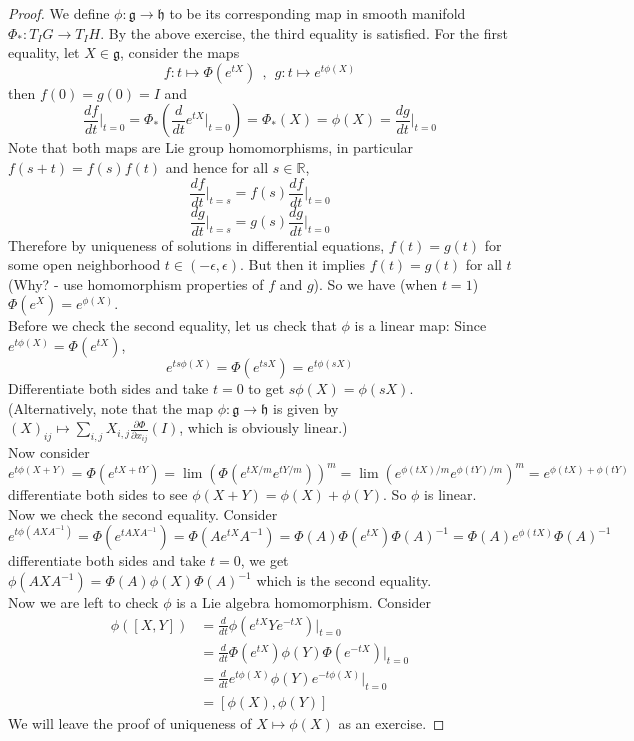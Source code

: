 \documentclass[11pt]{book}
\newcommand{\bb}[1]{\mathbb{#1}}
\newcommand{\mf}[1]{\mathfrak{#1}}
\begin{document}
\begin{proof}
We define $\phi: \mf{g} \to \mf{h}$ to be its corresponding map in smooth manifold $\Phi_*: T_IG \to T_IH$. By the above exercise, the third equality is satisfied. For the first equality, let $X \in \mf{g}$, consider the maps
$$f: t \mapsto \Phi(e^{tX})\ \ ,\ \ g:t \mapsto e^{t\phi(X)}$$
then $f(0) = g(0) = I$ and
$$\frac{df}{dt}  \Big|_{t = 0} = \Phi_* (\frac{d}{dt} e^{tX}  \Big|_{t = 0}) = \Phi_*(X) = \phi(X) = \frac{dg}{dt}  \Big|_{t = 0}$$
Note that both maps are Lie group homomorphisms, in particular $f(s+t) = f(s)f(t)$ and hence for all $s \in \bb{R}$,
$$\frac{df}{dt}  \Big|_{t = s} = f(s)\frac{df}{dt}  \Big|_{t=0}$$
$$\frac{dg}{dt}  \Big|_{t = s} = g(s)\frac{dg}{dt}  \Big|_{t = 0}$$
Therefore by uniqueness of solutions in differential equations, $f(t) = g(t)$ for some open neighborhood $t \in (-\epsilon, \epsilon)$. But then it implies $f(t) = g(t)$ for all $t$ (Why? - use homomorphism properties of $f$ and $g$). So we have (when $t=1$) $\Phi(e^X) = e^{\phi(X)}$.\\

Before we check the second equality, let us check that $\phi$ is a linear map: Since $e^{t\phi(X)} = \Phi(e^{tX})$,
$$e^{ts\phi(X)} = \Phi(e^{tsX}) = e^{t\phi(sX)}$$
Differentiate both sides and take $t = 0$ to get $s\phi(X) = \phi(sX)$.\\
(Alternatively, note that the map $\phi: \mf{g} \to \mf{h}$ is given by $(X)_{ij} \mapsto \sum_{i,j}X_{i,j} \frac{\partial \Phi}{\partial x_{ij}}(I)$, which is obviously linear.)\\
Now consider
$$e^{t\phi(X+Y)} = \Phi(e^{tX+tY}) = \lim (\Phi(e^{tX/m}e^{tY/m}))^m = \lim (e^{\phi(tX)/m}e^{\phi(tY)/m})^m = e^{\phi(tX) + \phi(tY)}$$
differentiate both sides to see $\phi(X+Y) = \phi(X) + \phi(Y)$. So $\phi$ is linear.\\

Now we check the second equality. Consider
$$e^{t\phi(AXA^{-1})} = \Phi(e^{tAXA^{-1}}) = \Phi(Ae^{tX}A^{-1}) = \Phi(A)\Phi(e^{tX})\Phi(A)^{-1} = \Phi(A)e^{\phi(tX)}\Phi(A)^{-1}$$
differentiate both sides and take $t = 0$, we get $\phi(AXA^{-1}) = \Phi(A)\phi(X)\Phi(A)^{-1}$ which is the second equality.\\

Now we are left to check $\phi$ is a Lie algebra homomorphism. Consider
\begin{align*}
\phi([X,Y]) &= \frac{d}{dt}\phi(e^{tX}Ye^{-tX})  \Big|_{t = 0}\\ &= \frac{d}{dt}\Phi(e^{tX})\phi(Y)\Phi(e^{-tX})  \Big|_{t = 0}\\ &= \frac{d}{dt} e^{t\phi(X)}\phi(Y)e^{-t\phi(X)}  \Big|_{t = 0}\\ &= [\phi(X), \phi(Y)]
\end{align*}
We will leave the proof of uniqueness of $X \mapsto \phi(X)$ as an exercise.
\end{proof}
\end{document}
